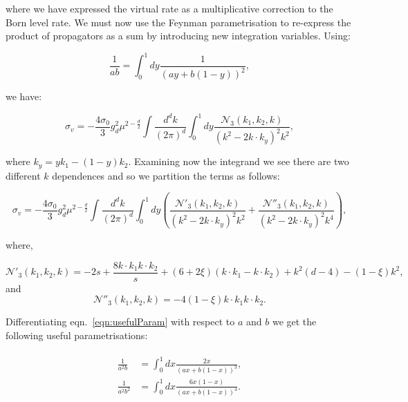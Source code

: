 			where we have expressed the virtual rate as a multiplicative correction to the Born level rate.
			We must now use the Feynman parametrisation to re-express the product of propagators as
			a sum by introducing new integration variables.  Using:

			\begin{equation}
				\frac{1}{ab} = \int_0^1dy\frac{1}{(ay+b(1-y))^2},
				\label{eqn:usefulParam}
			\end{equation}

			we have:

			\begin{equation}
				\sigma_v = -\frac{4\sigma_0}{3}g_d^2\mu^{2-\frac{d}{2}}\int\frac{d^{d}k}{(2\pi)^d}
				\int_0^1dy\frac{\mathcal{N}_3(k_1, k_2, k)}{(k^2-2k\cdot k_y)^2k^2},
			\end{equation}

			where $k_y = yk_1 -(1-y)k_2$.  Examining now the integrand we see there are two
			different $k$ dependences and so we partition the terms as follows:

			\begin{equation}
				\sigma_v = -\frac{4\sigma_0}{3}g_d^2\mu^{2-\frac{d}{2}}\int\frac{d^{d}k}{(2\pi)^d}\int_0^1dy
				\left(\frac{\mathcal{N}'_3(k_1, k_2, k)}{(k^2-2k\cdot k_y)^2k^2} +
				\frac{\mathcal{N}''_3(k_1, k_2, k)}{(k^2-2k\cdot k_y)^2k^4}\right),
			\end{equation}

			where,

			\begin{equation}
				\mathcal{N}'_3(k_1, k_2, k) = -2s + \frac{8k\cdot k_1k\cdot k_2}{s} +
				(6+2\xi)(k\cdot k_1 - k\cdot k_2) + k^2(d-4) - (1-\xi)k^2,
			\end{equation}
			and
			\begin{equation}
				\mathcal{N}''_3(k_1, k_2, k) = - 4(1-\xi)k\cdot k_1 k\cdot k_2.
			\end{equation}

			Differentiating eqn.~\eqref{eqn:usefulParam} with respect to $a$ and $b$ we get the following useful parametrisations:

			\begin{align}
			\begin{split}
				\frac{1}{a^2b} &= \int_0^1dx\frac{2x}{(ax+b(1-x))^3},\\
				\frac{1}{a^2b^2} &= \int_0^1dx\frac{6x(1-x)}{(ax+b(1-x))^4}.
			\end{split}
			\end{align}

